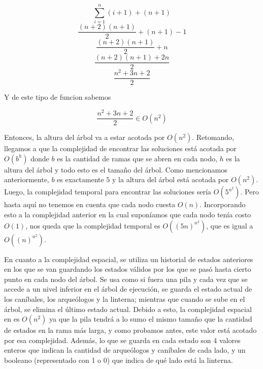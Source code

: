       \[
      \sum_{i=1}^{n}(i+1) + (n+1)
      \]
      \[
      \frac{(n+2)(n+1)}{2} + (n+1) - 1
      \]
      \[
      \frac{(n+2)(n+1)}{2} + n
      \]
      \[
      \frac{(n+2)(n+1)+2n}{2}
      \]
      \[
      \frac{n^2+3n+2}{2}
      \]

      Y de este tipo de funcion sabemos \newline

      \[
      \frac{n^2+3n+2}{2} \in O(n^2)
      \]

      Entonces, la altura del árbol va a estar acotada por $O(n^2)$.
      Retomando, llegamos a que la complejidad de encontrar las soluciones está acotada por $O(b^h)$ donde $b$ es la cantidad de ramas que se abren en cada nodo, $h$ es la altura del árbol y todo esto es el tamaño del árbol. Como mencionamos anteriormente, $b$ es exactamente $5$ y la altura del árbol está acotada por $O(n^2)$. Luego, la complejidad temporal para encontrar las soluciones sería $O(5^{n^2})$. Pero hasta aquí no tenemos en cuenta que cada nodo cuesta $O(n)$. Incorporando esto a la complejidad anterior en la cual suponíamos que cada nodo tenía costo $O(1)$, nos queda que la complejidad temporal es $O((5n)^{n^2})$, que es igual a $O((n)^{n^2})$.

      En cuanto a la complejidad espacial, se utiliza un historial de estados anteriores en los que se van guardando los estados válidos por los que se pasó hasta cierto punto en cada nodo del árbol. Se usa como si fuera una pila y cada vez que se accede a un nivel inferior en el árbol de ejecución, se guarda el estado actual de los caníbales, los arqueólogos y la linterna; mientras que cuando se sube en el árbol, se elimina el último estado actual. Debido a esto, la complejidad espacial en es $O(n^2)$ ya que la pila tendrá a lo sumo el mismo tamaño que la cantidad de estados en la rama más larga, y como probamos antes, este valor está acotado por esa complejidad. Además, lo que se guarda en cada estado son 4 valores enteros que indican la cantidad de arqueólogos y caníbales de cada lado, y un booleano (representado con 1 o 0) que indica de qué lado está la linterna.




